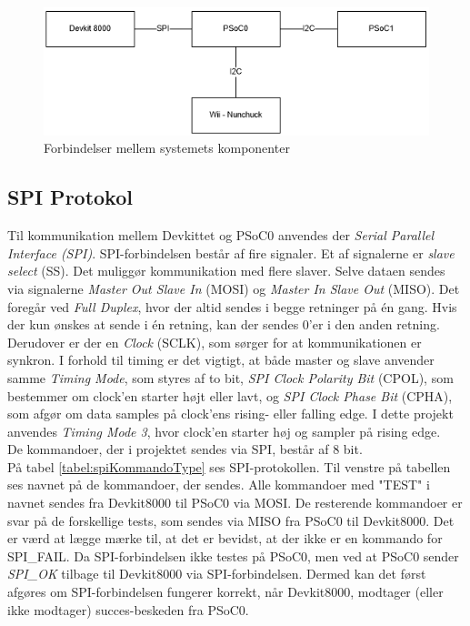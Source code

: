\begin{figure}[H]
	\centering
	\includegraphics[width=\textwidth] {Systemarkitektur/images/anvendtebustyper}
	\caption{Forbindelser mellem systemets komponenter}
	\label{fig:kommunikationsOverblik}
\end{figure}

\subsection{SPI Protokol}
\label{afsnit:spiprotokol}
Til kommunikation mellem Devkittet og PSoC0 anvendes der \textit{Serial Parallel Interface (SPI)}. SPI-forbindelsen består af fire signaler. Et af signalerne er \textit{slave select} (SS). Det muliggør kommunikation med flere slaver. Selve dataen sendes via signalerne \textit{Master Out Slave In} (MOSI) og \textit{Master In Slave Out} (MISO). Det foregår ved \textit{Full Duplex}, hvor der altid sendes i begge retninger på én gang. Hvis der kun ønskes at sende i én retning, kan der sendes 0'er i den anden retning. Derudover er der en \textit{Clock} (SCLK), som sørger for at kommunikationen er synkron. I forhold til timing er det vigtigt, at både master og slave anvender samme \textit{Timing Mode}, som styres af to bit, \textit{SPI Clock Polarity Bit} (CPOL), som bestemmer om clock'en starter højt eller lavt, og \textit{SPI Clock Phase Bit} (CPHA), som afgør om data samples på clock'ens rising- eller falling edge. I dette projekt anvendes \textit{Timing Mode 3}, hvor clock'en starter høj og sampler på rising edge. \\
De kommandoer, der i projektet sendes via SPI, består af 8 bit. \\
På tabel \ref{tabel:spiKommandoType} ses SPI-protokollen. Til venstre på tabellen ses navnet på de kommandoer, der sendes. Alle kommandoer med "TEST" i navnet sendes fra Devkit8000 til PSoC0 via MOSI. De resterende kommandoer er svar på de forskellige tests, som sendes via MISO fra PSoC0 til Devkit8000. Det er værd at lægge mærke til, at det er bevidst, at der ikke er en kommando for SPI\_FAIL. Da SPI-forbindelsen ikke testes på PSoC0, men ved at PSoC0 sender \textit{SPI\_OK} tilbage til Devkit8000 via SPI-forbindelsen. Dermed kan det først afgøres om SPI-forbindelsen fungerer korrekt, når Devkit8000, modtager (eller ikke modtager) succes-beskeden fra PSoC0. \\


